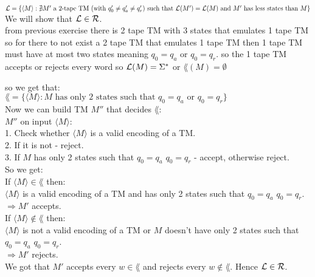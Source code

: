 $\mathcal{L} = \{\langle M \rangle : \nexists M' \text{ a 2-tape TM } (\text{with } q'_0 \neq q'_a \neq q'_r) \text{ such that } \\
    \mathcal{L}(M')=\mathcal{L}(M) \text{ and } M' \text{ has less states than } M\}$ \\

We will show that $\mathcal{L} \in \mathcal{R}$. \\

from previous exercise there is 2 tape TM with 3 states that emulates 1 tape TM
so for there to not exist a 2 tape TM that emulates 1 tape TM then 1 tape TM must have at most two states
meaning $q_0 = q_a$ or $q_0 = q_r$.
so the 1 tape TM accepts or rejects every word so $\mathcal{L}(M) = \Sigma^*$ or $\lang(M) = \emptyset$

so we get that: \\
$\lang = \{\langle M \rangle : M \text{ has only 2 states such that } q_0 = q_a \text{ or }q_0 = q_r\}$ \\

Now we can build TM $M''$ that decides $\lang$: \\
$M''$ on input $\langle M \rangle$: \\
1. Check whether $\langle M \rangle$ is a valid encoding of a TM. \\
2. If it is not - reject. \\
3. If $M$ has only 2 states such that $q_0 = q_a$ $q_0 = q_r$ - accept, otherwise reject. \\

So we get: \\
If $\langle M \rangle \in \lang$ then: \\
$\langle M \rangle$ is a valid encoding of a TM and has only 2 states such that $q_0 = q_a$ $q_0 = q_r$. \\
$\Rightarrow M'$ accepts. \\

If $\langle M \rangle \notin \lang$ then: \\
$\langle M \rangle$ is not a valid encoding of a TM or $M$ doesn't have only 2 states such that $q_0 = q_a$ $q_0 = q_r$. \\
$\Rightarrow M'$ rejects. \\

We got that $M'$ accepts every $w \in \lang$ and rejects every $w \notin \lang$. Hence $\mathcal{L} \in \mathcal{R}$. \\

